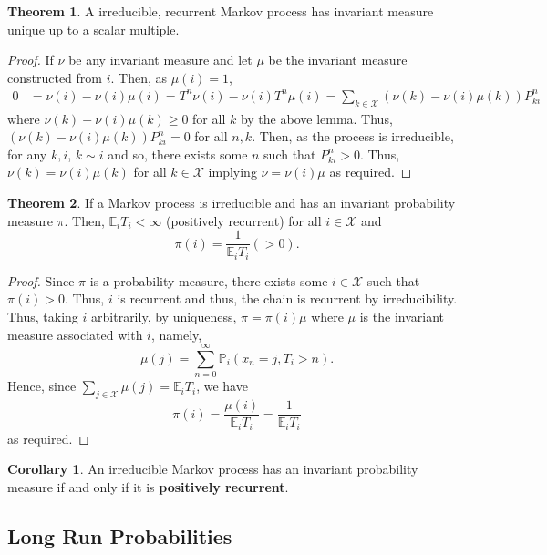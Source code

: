 \documentclass[]{article}
\theoremstyle{definition}
\newtheorem{theorem}{Theorem}
\newtheorem{corollary}{Corollary}[theorem]
\theoremstyle{definition}
\begin{document}
\begin{theorem}
  A irreducible, recurrent Markov process has invariant measure unique up to a scalar multiple.
\end{theorem}
\begin{proof}
  If \(\nu\) be any invariant measure and let \(\mu\) be the invariant measure 
  constructed from \(i\). Then, as \(\mu(i) = 1\),
  \[\begin{split}
    0 & = \nu(i) - \nu(i)\mu(i) = T^n \nu(i) - \nu(i)T^n\mu(i)
       = \sum_{k \in \mathcal{X}} (\nu(k) - \nu(i) \mu(k)) P^n_{ki}
  \end{split}\]
  where \(\nu(k) - \nu(i) \mu(k) \ge 0\) for all \(k\) by the above lemma.
  Thus, \((\nu(k) - \nu(i) \mu(k)) P^n_{ki} = 0\) for all \(n, k\). Then, 
  as the process is irreducible, for any \(k, i\), \(k \sim i\) and so, there 
  exists some \(n\) such that \(P^n_{ki} > 0\). Thus, \(\nu(k) = \nu(i)\mu(k)\) 
  for all \(k \in \mathcal{X}\) implying \(\nu = \nu(i)\mu\) as required. 
\end{proof}

\begin{theorem}
  If a Markov process is irreducible and has an invariant probability measure \(\pi\). 
  Then, \(\mathbb{E}_iT_i < \infty\) (positively recurrent) for all \(i \in \mathcal{X}\) and 
  \[\pi(i) = \frac{1}{\mathbb{E}_i T_i} (> 0).\]
\end{theorem}
\begin{proof}
  Since \(\pi\) is a probability measure, there exists some \(i \in \mathcal{X}\) 
  such that \(\pi(i) > 0\). Thus, \(i\) is recurrent and thus, the chain is recurrent 
  by irreducibility. Thus, taking \(i\) arbitrarily, by uniqueness, 
  \(\pi = \pi(i) \mu\) where \(\mu\) is 
  the invariant measure associated with \(i\), namely, 
  \[\mu(j) = \sum_{n = 0}^\infty \mathbb{P}_i(x_n = j, T_i > n).\]
  Hence, since \(\sum_{j \in \mathcal{X}} \mu(j) = \mathbb{E}_i T_i\), we have 
  \[\pi(i) = \frac{\mu(i)}{\mathbb{E}_i T_i} = \frac{1}{\mathbb{E}_i T_i}\]
  as required.
\end{proof}

\begin{corollary}
  An irreducible Markov process has an invariant probability measure if and only if 
  it is \textbf{positively recurrent}.
\end{corollary}

\subsection{Long Run Probabilities}
\end{document}
